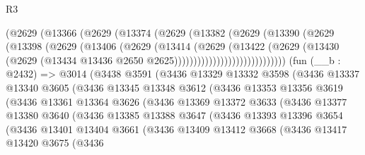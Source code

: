 \begin{lexlean}{R3}
\begin{coremodule}
                      (@2629
                        (@13366
                          (@2629
                            (@13374
                              (@2629
                                (@13382
                                  (@2629
                                    (@13390
                                      (@2629
                                        (@13398
                                          (@2629
                                            (@13406
                                              (@2629
                                                (@13414
                                                  (@2629
                                                    (@13422
                                                      (@2629
                                                        (@13430
                                                          (@2629
                                                            (@13434
                                                              @13436
                                                              @2650
                                                              @2625)))))))))))))))))))))))))))))
    (fun (__b : @2432) =>
    @3014
      (@3438
        @3591
        (@3436
          @13329
          @13332
          @3598
          (@3436
            @13337
            @13340
            @3605
            (@3436
              @13345
              @13348
              @3612
              (@3436
                @13353
                @13356
                @3619
                (@3436
                  @13361
                  @13364
                  @3626
                  (@3436
                    @13369
                    @13372
                    @3633
                    (@3436
                      @13377
                      @13380
                      @3640
                      (@3436
                        @13385
                        @13388
                        @3647
                        (@3436
                          @13393
                          @13396
                          @3654
                          (@3436
                            @13401
                            @13404
                            @3661
                            (@3436
                              @13409
                              @13412
                              @3668
                              (@3436
                                @13417
                                @13420
                                @3675
                                (@3436

\end{coremodule}
\end{lexlean}
